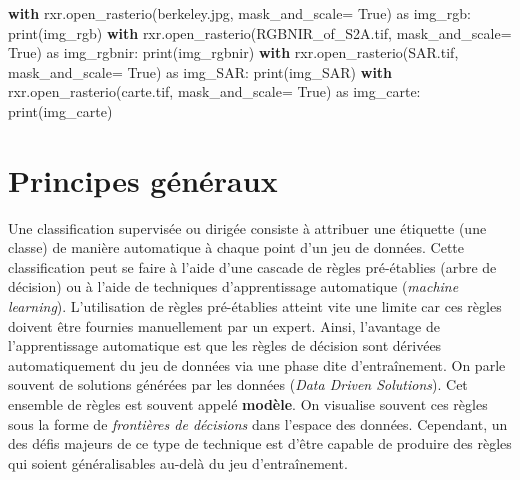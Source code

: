 \documentclass[
  11pt,
  letterpaper,
  open=any,
  twoside=false,
  french]{scrbook}
\newenvironment{Shaded}{\begin{snugshade}}{\end{snugshade}}
\newcommand{\BuiltInTok}[1]{\textcolor[rgb]{0.00,0.23,0.31}{#1}}
\newcommand{\ControlFlowTok}[1]{\textcolor[rgb]{0.00,0.23,0.31}{\textbf{#1}}}
\newcommand{\ImportTok}[1]{\textcolor[rgb]{0.00,0.46,0.62}{#1}}
\newcommand{\NormalTok}[1]{\textcolor[rgb]{0.00,0.23,0.31}{#1}}
\newcommand{\OperatorTok}[1]{\textcolor[rgb]{0.37,0.37,0.37}{#1}}
\newcommand{\StringTok}[1]{\textcolor[rgb]{0.13,0.47,0.30}{#1}}
\newcommand{\VariableTok}[1]{\textcolor[rgb]{0.07,0.07,0.07}{#1}}
\begin{document}
\begin{Shaded}
\begin{Highlighting}[]
\ControlFlowTok{with}\NormalTok{ rxr.open\_rasterio(}\StringTok{\textquotesingle{}berkeley.jpg\textquotesingle{}}\NormalTok{, mask\_and\_scale}\OperatorTok{=} \VariableTok{True}\NormalTok{) }\ImportTok{as}\NormalTok{ img\_rgb:}
    \BuiltInTok{print}\NormalTok{(img\_rgb)}
\ControlFlowTok{with}\NormalTok{ rxr.open\_rasterio(}\StringTok{\textquotesingle{}RGBNIR\_of\_S2A.tif\textquotesingle{}}\NormalTok{, mask\_and\_scale}\OperatorTok{=} \VariableTok{True}\NormalTok{) }\ImportTok{as}\NormalTok{ img\_rgbnir:}
    \BuiltInTok{print}\NormalTok{(img\_rgbnir)}
\ControlFlowTok{with}\NormalTok{ rxr.open\_rasterio(}\StringTok{\textquotesingle{}SAR.tif\textquotesingle{}}\NormalTok{, mask\_and\_scale}\OperatorTok{=} \VariableTok{True}\NormalTok{) }\ImportTok{as}\NormalTok{ img\_SAR:}
    \BuiltInTok{print}\NormalTok{(img\_SAR)}
\ControlFlowTok{with}\NormalTok{ rxr.open\_rasterio(}\StringTok{\textquotesingle{}carte.tif\textquotesingle{}}\NormalTok{, mask\_and\_scale}\OperatorTok{=} \VariableTok{True}\NormalTok{) }\ImportTok{as}\NormalTok{ img\_carte:}
    \BuiltInTok{print}\NormalTok{(img\_carte)}
\end{Highlighting}
\end{Shaded}

\section{Principes généraux}\label{principes-guxe9nuxe9raux}

Une classification supervisée ou dirigée consiste à attribuer une
étiquette (une classe) de manière automatique à chaque point d'un jeu de
données. Cette classification peut se faire à l'aide d'une cascade de
règles pré-établies (arbre de décision) ou à l'aide de techniques
d'apprentissage automatique (\emph{machine learning}). L'utilisation de
règles pré-établies atteint vite une limite car ces règles doivent être
fournies manuellement par un expert. Ainsi, l'avantage de
l'apprentissage automatique est que les règles de décision sont dérivées
automatiquement du jeu de données via une phase dite d'entraînement. On
parle souvent de solutions générées par les données (\emph{Data Driven
Solutions}). Cet ensemble de règles est souvent appelé \textbf{modèle}.
On visualise souvent ces règles sous la forme de \emph{frontières de
décisions} dans l'espace des données. Cependant, un des défis majeurs de
ce type de technique est d'être capable de produire des règles qui
soient généralisables au-delà du jeu d'entraînement.
\end{document}
